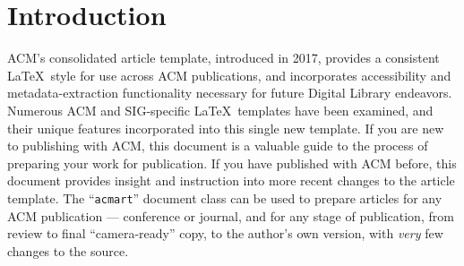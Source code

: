
\section{Introduction}\label{sec:introduction}
ACM's consolidated article template, introduced in 2017, provides a
consistent \LaTeX\ style for use across ACM publications, and
incorporates accessibility and metadata-extraction functionality
necessary for future Digital Library endeavors.
Numerous ACM and
SIG-specific \LaTeX\ templates have been examined, and their unique
features incorporated into this single new template.
If you are new to publishing with ACM, this document is a valuable
guide to the process of preparing your work for publication.
If you
have published with ACM before, this document provides insight and
instruction into more recent changes to the article template.
The ``\verb|acmart|'' document class can be used to prepare articles
for any ACM publication --- conference or journal, and for any stage
of publication, from review to final ``camera-ready'' copy, to the
author's own version, with {\itshape very} few changes to the source.
